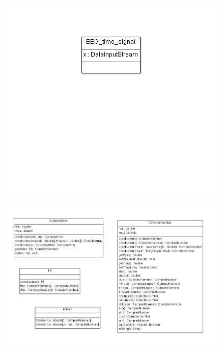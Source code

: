 			\begin{figure}
			\centering
		    \includegraphics []{../diagramme_classes/eeg.png} \\
			\label{fig_eeg}
  			\end{figure}
			\begin{figure}
			\centering
		    \includegraphics [scale=0.5]{../diagramme_classes/math.png} \\
			\label{fig_math}
    		\end{figure}
